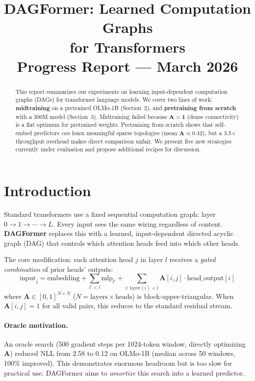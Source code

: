 \documentclass[11pt,a4paper]{article}
\title{\textbf{DAGFormer: Learned Computation Graphs\\for Transformers}\\[0.5em]
\large Progress Report --- March 2026}
\author{}
\date{}
\newcommand{\A}{\mathbf{A}}
\begin{document}
\maketitle
\thispagestyle{empty}

\begin{abstract}
This report summarizes our experiments on learning input-dependent computation graphs (DAGs) for transformer language models. We cover two lines of work: \textbf{midtraining} on a pretrained OLMo-1B (Section~2), and \textbf{pretraining from scratch} with a 300M model (Section~3). Midtraining failed because $\A=\mathbf{1}$ (dense connectivity) is a flat optimum for pretrained weights. Pretraining from scratch shows that self-embed predictors \emph{can} learn meaningful sparse topologies (mean $\A \approx 0.42$), but a 3.5$\times$ throughput overhead makes direct comparison unfair. We present five new strategies currently under evaluation and propose additional recipes for discussion.
\end{abstract}

\section{Introduction}

Standard transformers use a fixed sequential computation graph: layer $0 \to 1 \to \cdots \to L$. Every input sees the same wiring regardless of content. \textbf{DAGFormer} replaces this with a learned, input-dependent directed acyclic graph (DAG) that controls which attention heads feed into which other heads.

The core modification: each attention head $j$ in layer $l$ receives a \emph{gated combination} of prior heads' outputs:
\[
\text{input}_j = \text{embedding} + \sum_{l' < l} \text{mlp}_{l'} + \sum_{i:\,\text{layer}(i)<l} \A[i,j] \cdot \text{head\_output}[i]
\]
where $\A \in [0,1]^{N \times N}$ ($N = \text{layers} \times \text{heads}$) is block-upper-triangular. When $\A[i,j]=1$ for all valid pairs, this reduces to the standard residual stream.

\paragraph{Oracle motivation.} An oracle search (500 gradient steps per 1024-token window, directly optimizing $\A$) reduced NLL from 2.58 to 0.12 on OLMo-1B (median across 50 windows, 100\% improved). This demonstrates enormous headroom but is too slow for practical use. DAGFormer aims to \emph{amortize} this search into a learned predictor.
\end{document}
